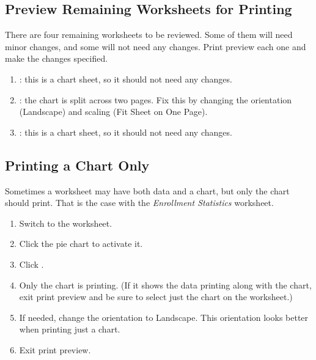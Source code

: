 \subsection{Preview Remaining Worksheets for Printing}

There are four remaining worksheets to be reviewed. Some of them will need minor changes, and some will not need any changes. Print preview each one and make the changes specified.

\begin{enumbox}
	\begin{enumerate}
		\item {}: this is a chart sheet, so it should not need any changes.
		\item {}: the chart is split across two pages. Fix this by changing the orientation (Landscape) and scaling (Fit Sheet on One Page).
		\item {}: this is a chart sheet, so it should not need any changes.
	\end{enumerate}
\end{enumbox}

\subsection{Printing a Chart Only}

Sometimes a worksheet may have both data and a chart, but only the chart should print. That is the case with the \textit{Enrollment Statistics} worksheet.

\begin{enumbox}
	\begin{enumerate}
		\item Switch to the  worksheet.
		\item Click the pie chart to activate it.
		\item Click .
		\item Only the chart is printing. (If it shows the data printing along with the chart, exit print preview and be sure to select just the chart on the worksheet.)
		\item If needed, change the orientation to Landscape. This orientation looks better when printing just a chart.
		\item Exit print preview.
	\end{enumerate}
\end{enumbox}
	
